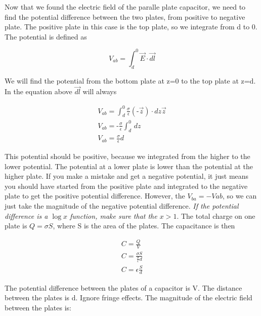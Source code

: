 \documentclass{ximera}
\begin{document}
Now that we found the electric field of the paralle plate capacitor, we need to find the potential difference between the two plates, from positive to negative plate. The positive plate in this case is the top plate, so we integrate from d to 0. The potential is defined as 

\begin{equation}
V_{ab}= \int_d^0 \vec{E} \cdot \vec{dl}
\end{equation}


We will find the potential from the bottom plate at z=0 to the top plate at z=d. In the equation above $\vec{dl}$ will always

\begin{eqnarray}
V_{ab}= \int_d^0   \frac{\sigma}{ \epsilon } (\text{-} \vec{z}) \cdot dz \vec{z} \\
V_{ab}= \text{-} \frac{\sigma}{ \epsilon } \int_d^0     \, dz \\
V_{ab}=\frac{\sigma}{ \epsilon } d
\end{eqnarray}

This potential should be positive, because we integrated from the higher to the lower potential. The potential at a lower plate is lower than the potential at the higher plate. If you make a mistake and get a negative potential, it just means you should have started from the positive plate and integrated to the negative plate to get the positive potential difference. However, the $V_{ba}=-V{ab}$, so we can just take the magnitude of the negative potential difference. {\it If the potential difference is a $\log x$ function, make sure that the $x>1$}. The total charge on one plate is $Q=\sigma S$, where S is the area of the plates. The capacitance is then


\begin{eqnarray}
C=\frac{Q}{V} \\
C=\frac{\sigma S}{\frac{\sigma }{ \epsilon } d } \\
C=\epsilon  \frac{S}{d}
\end{eqnarray}


\begin{question}  
The potential difference between the plates of a capacitor is  V. The distance between the plates is d. Ignore fringe effects. The magnitude of the electric field between the plates is:
 
\begin{multipleChoice}  
\end{multipleChoice}  
\end{question} 
\end{document}
